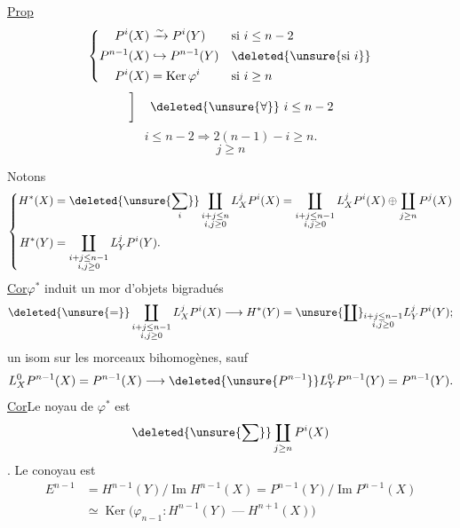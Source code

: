 \uline{Prop}
\[
\left\{\begin{aligned}
P^i(X)&\xrightarrow{\sim}P^i(Y) &&\text{si }i\leq n-2\\
P^{n-1}(X)&\hookrightarrow P^{n-1}(Y) &&\deleted{\unsure{\text{si }i}}\\
P^i(X)&=\operatorname{Ker}\varphi^i &&\text{si }i\geq n
\end{aligned}\right.
\]
\[\left.\vphantom{\begin{matrix}H^i(X)\\H^i(Y)\end{matrix}}\right]\quad\deleted{\unsure{\forall}}\ i\leq n-2\]
\[i\leq n-2\Rightarrow 2(n-1)-i\geq n.\]
\[j\geq n\]

\uline{}\qquad Notons
\[
\left\{\begin{aligned}
H^*(X)&=\deleted{\unsure{\sum_i}}\coprod_{\substack{i+j\leq n\\i,j\geq0}}L_X^jP^i(X)
=\coprod_{\substack{i+j\leq n-1\\i,j\geq0}}L_X^jP^i(X)\oplus\coprod_{j\geq n}P^j(X)\\
H^*(Y)&=\coprod_{\substack{i+j\leq n-1\\i,j\geq0}}L_Y^jP^i(Y).
\end{aligned}\right.
\]
\uline{Cor}\qquad $\varphi^*$ induit un mor d'objets bigradués
\[
\deleted{\unsure{=}}\coprod_{\substack{i+j\leq n-1\\i,j\geq0}}L_X^jP^i(X)
\longrightarrow H^*(Y)=\unsure{\coprod}_{\substack{i+j\leq n-1\\i,j\geq0}}L_Y^jP^i(Y);\]
  un isom sur les morceaux bihomogènes, sauf
\[
L_X^0P^{n-1}(X)=P^{n-1}(X)\longrightarrow\deleted{\unsure{P^{n-1}}}L_Y^0P^{n-1}(Y)=P^{n-1}(Y).
\]
\uline{Cor}\qquad Le noyau de $\varphi^*$ est 
\[\deleted{\unsure{\sum}}\coprod_{j\geq n}P^i(X)\]
. Le conoyau est
\[
\begin{aligned}
E^{n-1}&=H^{n-1}(Y)/\operatorname{Im}H^{n-1}(X)=P^{n-1}(Y)/\operatorname{Im}P^{n-1}(X)\\
&\simeq\operatorname{Ker}\bigl(\varphi_{n-1}:H^{n-1}(Y)\mathrel{\text{---}}H^{n+1}(X)\bigr)
\end{aligned}
\]
